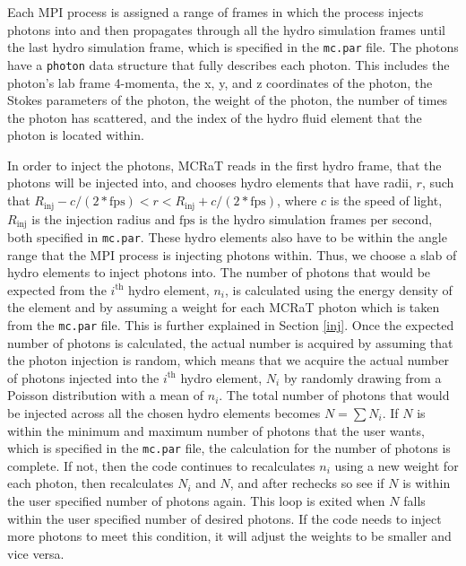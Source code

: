 \documentclass[12pt,a4paper]{article}
\begin{document}
Each MPI process is assigned a range of frames in which the process injects photons into and then propagates through all the hydro simulation frames until the last hydro simulation frame, which is specified in the \texttt{mc.par} file. The photons have a \texttt{photon} data structure that fully describes each photon. This includes the photon's lab frame 4-momenta, the x, y, and z coordinates of the photon, the Stokes parameters of the photon, the weight of the photon, the number of times the photon has scattered, and the index of the hydro fluid element that the photon is located within.

In order to inject the photons, MCRaT reads in the first hydro frame, that the photons will be injected into, and chooses hydro elements that have radii, $r$, such that $R_\mathrm{inj}-c/(2*\mathrm{fps}) < r < R_\mathrm{inj}+c/(2*\mathrm{fps})$, where $c$ is the speed of light, $R_\mathrm{inj}$ is the injection radius and $\mathrm{fps}$ is the hydro simulation frames per second, both specified in \texttt{mc.par}. These hydro elements also have to be within the angle range that the MPI process is injecting photons within. Thus, we choose a slab of hydro elements to inject photons into. The number of photons that would be expected from the $i^\mathrm{th}$ hydro element, $n_i$, is calculated using the energy density of the element and by assuming a weight for each MCRaT photon which is taken from the \texttt{mc.par} file. This is further explained in Section \ref{inj}. Once the expected number of photons is calculated, the actual number is acquired by assuming that the photon injection is random, which means that we acquire the actual number of photons injected into the $i^\mathrm{th}$ hydro element, $N_i$ by randomly drawing from a Poisson distribution with a mean of $n_i$. The total number of photons that would be injected across all the chosen hydro elements becomes $N=\sum N_i$. If $N$ is within the minimum and maximum number of photons that the user wants, which is specified in the \texttt{mc.par} file, the calculation for the number of photons is complete. If not, then the code continues to recalculates $n_i$ using a new weight for each photon, then recalculates $N_i$ and $N$, and after rechecks so see if $N$ is within the user specified number of photons again. This loop is exited when $N$ falls within the user specified number of desired photons. If the code needs to inject more photons to meet this condition, it will adjust the weights to be smaller and vice versa.
\end{document}
